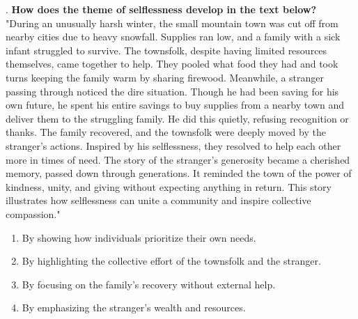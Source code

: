 \documentclass[12pt]{article}
\begin{document}
\vspace{1cm}
. \textbf{How does the theme of selflessness develop in the text below?\\}
"During an unusually harsh winter, the small mountain town was cut off from nearby cities due to heavy snowfall. Supplies ran low, and a family with a sick infant struggled to survive. The townsfolk, despite having limited resources themselves, came together to help. They pooled what food they had and took turns keeping the family warm by sharing firewood. Meanwhile, a stranger passing through noticed the dire situation. Though he had been saving for his own future, he spent his entire savings to buy supplies from a nearby town and deliver them to the struggling family. He did this quietly, refusing recognition or thanks. The family recovered, and the townsfolk were deeply moved by the stranger’s actions. Inspired by his selflessness, they resolved to help each other more in times of need. The story of the stranger’s generosity became a cherished memory, passed down through generations. It reminded the town of the power of kindness, unity, and giving without expecting anything in return. This story illustrates how selflessness can unite a community and inspire collective compassion."  
\begin{enumerate}[label=\Alph*.]
    \item By showing how individuals prioritize their own needs.  
    \item By highlighting the collective effort of the townsfolk and the stranger.  
    \item By focusing on the family’s recovery without external help.  
    \item By emphasizing the stranger’s wealth and resources.  
\end{enumerate}
\end{document}

